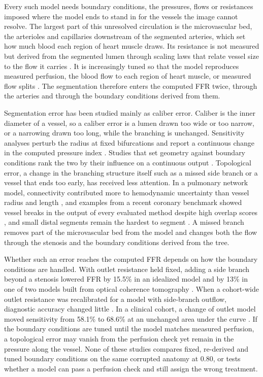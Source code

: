 \documentclass[journal]{IEEEtran}
\begin{document}
Every such model needs boundary conditions, the pressures, flows or resistances imposed where the model ends to stand in for the vessels the image cannot resolve. The largest part of this unresolved circulation is the
microvascular bed, the arterioles and capillaries downstream of the segmented arteries, which set how much blood
each region of heart muscle draws. Its resistance is not measured but derived from the segmented lumen through
scaling laws that relate vessel size to the flow it carries \cite{murray1926,kim2010}. It is increasingly tuned so that the model reproduces measured perfusion, the blood flow to each region of heart
muscle, or measured flow splits \cite{menon2024,arminio2026}. The segmentation therefore enters the computed FFR twice, through the arteries and through the boundary conditions derived from them.

Segmentation error has been studied mainly as caliber error. Caliber is the inner diameter of a vessel, so a caliber error is a lumen drawn too wide or too narrow, or a narrowing drawn too long, while the branching is unchanged. Sensitivity analyses perturb the radius at fixed bifurcations and report a continuous change in the computed pressure index \cite{sankaran2015tmi,sankaran2015cmame,fernandez2024,dalmaso2025}. Studies that set geometry against
boundary conditions rank the two by their influence on a continuous output \cite{sankaran2016,tanade2022,korte2023}. Topological error, a change in the branching structure itself such as a missed side branch or a vessel that ends too early, has received less attention. In a pulmonary network model, connectivity contributed more to hemodynamic uncertainty than vessel radius and
length \cite{colebank2019}, and examples from a recent coronary benchmark showed vessel breaks in the output of every evaluated method despite high overlap scores \cite{bransby2026}, and small distal segments remain the hardest to segment
\cite{chen2025}. A missed branch removes part of the microvascular bed from the model and changes both the flow
through the stenosis and the boundary conditions derived from the tree.

Whether such an error reaches the computed FFR depends on how the boundary conditions are handled. With outlet resistance held fixed, adding a side branch beyond a stenosis lowered FFR by 15.5\% in an idealized model and by 13\% in one of two models built from optical coherence tomography \cite{gamage2022}. When a cohort-wide outlet resistance was recalibrated for a model with side-branch outflow, diagnostic accuracy changed little \cite{gosling2020}. In a clinical cohort, a change of outlet model moved sensitivity from 58.1\% to 68.6\% at an unchanged area under
the curve \cite{fossan2026}. If the boundary conditions are tuned until the model matches measured perfusion, a topological error may vanish
from the perfusion check yet remain in the pressure along the vessel. None of these studies compares fixed, re-derived and tuned boundary conditions on the same corrupted anatomy at
0.80, or tests whether a model can pass a perfusion check and still assign the wrong treatment.
\end{document}
